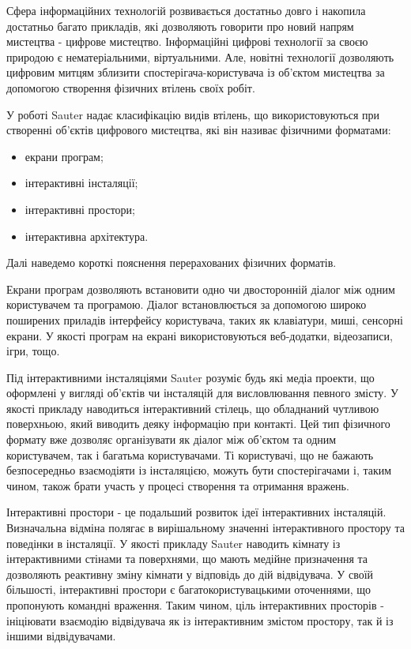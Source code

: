 \documentclass[a4paper,ukrainian,utf8,nocolumnsxix,floatsection,equationsection]{eskdtext}
\begin{document}
Сфера інформаційних технологій розвивається достатньо довго і накопила достатньо багато прикладів, які дозволяють говорити про новий напрям мистецтва - цифрове мистецтво. Інформаційні цифрові технології за своєю природою є нематеріальними, віртуальними. Але, новітні технології дозволяють цифровим митцям зблизити спостерігача-користувача із об’єктом мистецтва за допомогою створення фізичних втілень своїх робіт. 

У роботі \cite{sauter:vierte:format} Sauter надає класифікацію видів втілень, що використовуються при створенні об’єктів цифрового мистецтва, які він називає фізичними форматами:

\begin{itemize}
	\item екрани програм;
	\item інтерактивні інсталяції;
	\item інтерактивні простори;
	\item інтерактивна архітектура.
\end{itemize}

Далі наведемо короткі пояснення перерахованих фізичних форматів.

Екрани програм дозволяють встановити одно чи двосторонній діалог між одним користувачем та програмою. Діалог встановлюється за допомогою широко поширених приладів інтерфейсу користувача, таких як клавіатури, миші, сенсорні екрани. У якості програм на екрані використовуються веб-додатки, відеозаписи, ігри, тощо.

Під інтерактивними інсталяціями Sauter розуміє будь які медіа проекти, що оформлені у вигляді об’єктів чи інсталяцій для висловлювання певного змісту. У якості прикладу наводиться інтерактивний стілець, що обладнаний чутливою поверхньою, який виводить деяку інформацію при контакті. Цей тип фізичного формату вже дозволяє організувати як діалог між об’єктом та одним користувачем, так і багатьма користувачами. Ті користувачі, що не бажають безпосередньо взаємодіяти із інсталяцією, можуть бути спостерігачами і, таким чином, також брати участь у процесі створення та отримання вражень. 

Інтерактивні простори - це подальший розвиток ідеї інтерактивних інсталяцій. Визначальна відміна полягає в вирішальному значенні інтерактивного простору та поведінки в інсталяції. У якості прикладу Sauter наводить кімнату із інтерактивними стінами та поверхнями, що мають медійне призначення та дозволяють реактивну зміну кімнати у відповідь до дій відвідувача. У своїй більшості, інтерактивні простори є багатокористувацькими оточеннями, що пропонують командні враження. Таким чином, ціль інтерактивних просторів - ініціювати взаємодію відвідувача як із інтерактивним змістом простору, так й із іншими відвідувачами.
\end{document}
